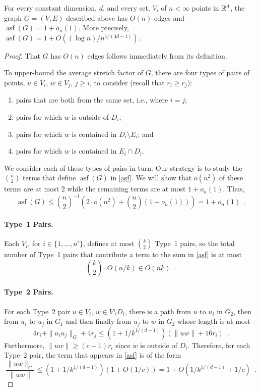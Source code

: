 \documentclass{patmorin}
\DeclareMathOperator{\asf}{asf}
\begin{document}
\begin{thm}
  For every constant dimension, $d$, and every set, $V$, of
  $n<\infty$ points in $\mathbb{R}^d$, the graph $G=(V,E)$ described above
  has $O(n)$ edges and $\asf(G)=1+o_n(1)$.  More precisely,
  $\asf(G)=1+O((\log n)/n^{1/(4d-1)})$.
\end{thm}

\begin{proof}
  That $G$ has $O(n)$ edges follows immediately from its definition.

  To upper-bound the average stretch factor of $G$, there are four types
  of pairs of points, $u\in V_i$, $w\in V_j$, $j\ge i$, to consider
  (recall that $r_i \ge r_j)$:
  \begin{enumerate}
    \item pairs that are both from the same set, i.e., where $i=j$;
    \item pairs for which $w$ is outside of $D_i$;
    \item pairs for which $w$ is contained in $D_i\setminus E_i$; and
    \item pairs for which $w$ is contained in $E_i\cap D_i$.
  \end{enumerate}
  We consider each of these types of pairs in turn.  Our strategy is to
  study the $\binom{n}{2}$ terms that define $\asf(G)$ in \eqref{asf}.
  We will show that $o(n^2)$ of these terms are at most 2 while the
  remaining terms are at most $1+o_n(1)$.  Thus,
  \[
     \asf(G)\le \binom{n}{2}^{-1}\left(2\cdot o(n^2)
                                       +\binom{n}{2}(1+o_n(1))\right)
     = 1+o_n(1) \enspace .
  \]

  \paragraph{Type~1 Pairs.}
  Each $V_i$, for $i\in\{1,\ldots,n'\}$, defines at most $\binom{k}{2}$
  Type~1 pairs, so the total number of Type~1 pairs that contribute a
  term to the sum in \eqref{asf} is at most
  \[
    \binom{k}{2}\cdot O(n/k) \in O(nk)
      \enspace .
  \]

  \paragraph{Type~2 Pairs.}
  For each Type~2 pair $u\in V_i$, $w\in V\setminus D_i$, there is a
  path from $u$ to $u_i$ in $G_2$, then from $u_i$ to $u_j$ in $G_1$
  and then finally from $u_j$ to $w$ in $G_2$ whose length is at most
  \[
     4r_i + \|u_iu_j\|_G + 4r_j
      \le (1+1/k^{1/(d-1)})(\|uw\| + 16r_i) \enspace .
  \]
  Furthermore, $\|uw\|\ge (c-1)r_i$ since $w$ is outside of $D_i$.
  Therefore, for each Type~2 pair, the term that appears in \eqref{asf}
  is of the form
  \[
    \frac{\|uw\|_G}{\|uw\|}\le (1+1/k^{1/(d-1)})(1+O(1/c)) 
       = 1+O(1/k^{1/(d-1)}+1/c) \enspace .
  \]


\end{proof}
\end{document}
